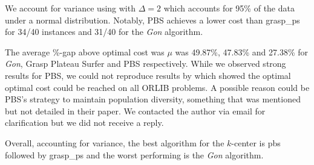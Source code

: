 We account for variance using  with $\Delta =2$ which accounts for 95\% of the data under a normal distribution. Notably, PBS achieves a lower cost than \acrshort{grasp_ps} for 34/40 instances and 31/40 for the \emph{Gon} algorithm. %

The average \%-gap above optimal cost was $\mu$ was 49.87\%, 47.83\% and 27.38\% for \emph{Gon}, Grasp Plateau Surfer and PBS respectively. While we observed strong results for PBS, we could not reproduce results by \cite{pullan_memetic_2008} which showed the optimal optimal cost could be reached on all ORLIB problems. A possible reason could be PBS's strategy to maintain population diversity, something that was mentioned but not detailed in their paper. We contacted the author via email for clarification but we did not receive a reply.

Overall, accounting for variance, the best algorithm for the $k$-center is \acrshort{pbs} followed by \acrshort{grasp_ps} and the worst performing is the \emph{Gon} algorithm.